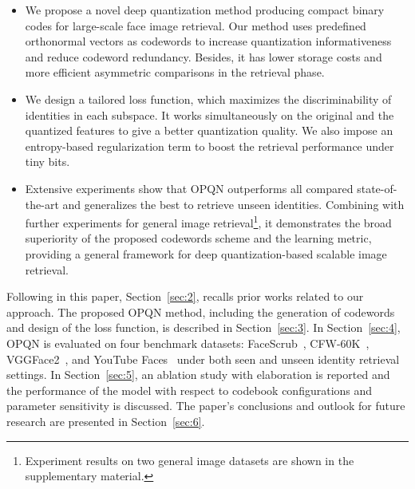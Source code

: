 \documentclass{elsarticle}
\begin{document}
\begin{itemize}
\item We propose a novel deep quantization method producing compact binary codes for large-scale face image retrieval. Our method uses predefined orthonormal vectors as codewords to increase quantization informativeness and reduce codeword redundancy. Besides, it has lower storage costs and more efficient asymmetric comparisons in the retrieval phase.

\item We design a tailored loss function, which maximizes the discriminability of identities in each subspace. It works simultaneously on the original and the quantized features to give a better quantization quality. We also impose an entropy-based regularization term to boost the retrieval performance under tiny bits.

\item %
Extensive experiments show that OPQN outperforms all compared state-of-the-art and generalizes the best to retrieve unseen identities. Combining with further experiments for general image retrieval\footnote{Experiment results on two general image datasets are shown in the supplementary material.}, it demonstrates the broad superiority of the proposed codewords scheme and the learning metric, providing a general framework for deep quantization-based scalable image retrieval.
\end{itemize}

Following in this paper, Section~\ref{sec:2}, recalls prior works related to our approach. The proposed OPQN method, including the generation of codewords and design of the loss function, is described in Section~\ref{sec:3}. In Section~\ref{sec:4}, OPQN is evaluated on four benchmark datasets: FaceScrub~\cite{ng2014data}, CFW-60K~\cite{li2015two}, VGGFace2~\cite{cao2018vggface2}, and YouTube Faces~\cite{wolf2011face} under both seen and unseen identity retrieval settings. In Section~\ref{sec:5}, an ablation study with elaboration is reported and the performance of the model with respect to codebook configurations and parameter sensitivity is discussed. %
The paper's conclusions and outlook for future research are presented in Section~\ref{sec:6}.
\end{document}

